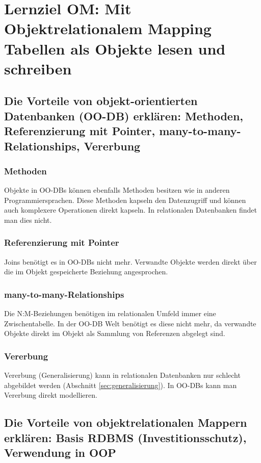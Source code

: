 \section{Lernziel OM: Mit Objektrelationalem Mapping Tabellen als Objekte lesen und schreiben}

\subsection{Die Vorteile von objekt-orientierten Datenbanken (OO-DB) erklären: Methoden, Referenzierung mit Pointer, many-to-many-Relationships, Vererbung}

\subsubsection{Methoden}
Objekte in OO-DBs können ebenfalls Methoden besitzen wie in anderen Programmiersprachen. Diese Methoden kapseln den Datenzugriff und können auch komplexere Operationen direkt kapseln. In relationalen Datenbanken findet man dies nicht.

\subsubsection{Referenzierung mit Pointer}
Joins benötigt es in OO-DBs nicht mehr. Verwandte Objekte werden direkt über die im Objekt gespeicherte Beziehung angesprochen.

\subsubsection{many-to-many-Relationships}
Die N:M-Beziehungen benötigen im relationalen Umfeld immer eine Zwischentabelle. In der OO-DB Welt benötigt es diese nicht mehr, da verwandte Objekte direkt im Objekt als Sammlung von Referenzen abgelegt sind.

\subsubsection{Vererbung}

Vererbung (Generalisierung) kann in relationalen Datenbanken nur schlecht abgebildet werden (Abschnitt \ref{sec:generalisierung}). In OO-DBs kann man Vererbung direkt modellieren.

\subsection{Die Vorteile von objektrelationalen Mappern erklären: Basis RDBMS (Investitionsschutz), Verwendung in OOP}

